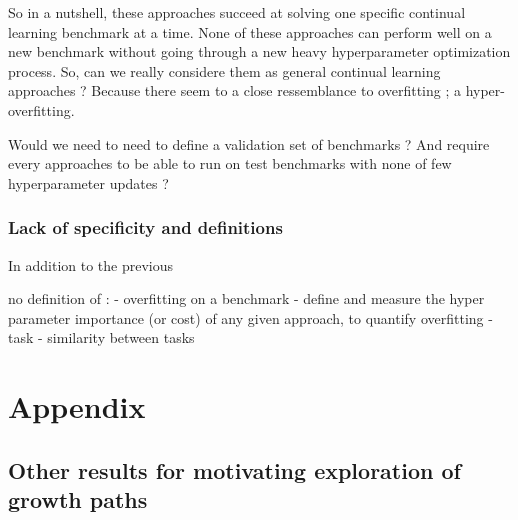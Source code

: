 \documentclass{article}
\begin{document}
So in a nutshell, these approaches succeed at solving one specific continual learning benchmark at a time. None of these approaches can perform well on a new benchmark without going through a new heavy hyperparameter optimization process. So, can we really considere them as general continual learning approaches ? Because there seem to a close ressemblance to overfitting ; a hyper-overfitting.

Would we need to need to define a validation set of benchmarks ? And require every approaches to be able to run on test benchmarks with none of few hyperparameter updates ?


\subsubsection{Lack of specificity and definitions}

In addition to the previous

no definition of :
- overfitting on a benchmark
    - define and measure the hyper parameter importance (or cost) of any given approach, to quantify overfitting
- task
- similarity between tasks

\nocite{*}
\printbibliography


\section*{Appendix}
\subsection{Other results for motivating exploration of growth paths}
\end{document}
